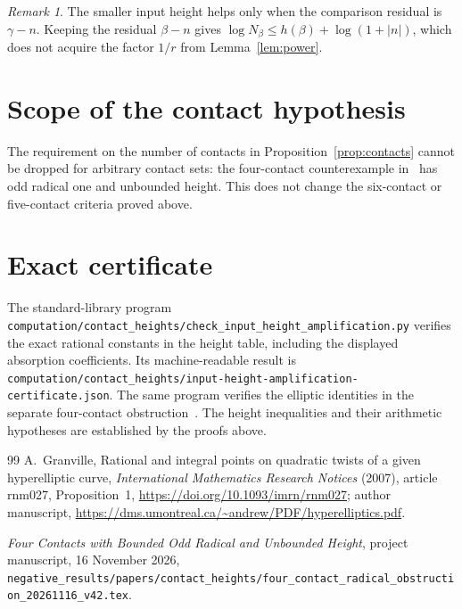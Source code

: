 \documentclass[11pt,a4paper]{article}
\theoremstyle{remark}\newtheorem{remark}[theorem]{Remark}
\begin{document}
\begin{remark}
The smaller input height helps only when the comparison residual
is $\gamma-n$. Keeping the residual $\beta-n$ gives
$\log N_\beta\le h(\beta)+\log(1+|n|)$, which does not acquire
the factor $1/r$ from Lemma~\ref{lem:power}.
\end{remark}

\section{Scope of the contact hypothesis}

The requirement on the number of contacts in
Proposition~\ref{prop:contacts} cannot be dropped for arbitrary contact
sets: the four-contact counterexample in~\cite{FourContacts} has odd
radical one and unbounded height. This does not change the six-contact
or five-contact criteria proved above.

\section{Exact certificate}

The standard-library program
\nolinkurl{computation/contact_heights/check_input_height_amplification.py}
verifies the exact rational constants in the height table, including
the displayed absorption coefficients. Its machine-readable result is
\nolinkurl{computation/contact_heights/input-height-amplification-certificate.json}.
The same program verifies the elliptic identities in the separate
four-contact obstruction~\cite{FourContacts}. The height inequalities
and their arithmetic hypotheses are established by the proofs above.

\begin{thebibliography}{99}
A.~Granville, Rational and integral points on quadratic twists of a
given hyperelliptic curve, \emph{International Mathematics Research
Notices} (2007), article rnm027, Proposition~1,
\url{https://doi.org/10.1093/imrn/rnm027}; author manuscript,
\url{https://dms.umontreal.ca/~andrew/PDF/hyperelliptics.pdf}.

\emph{Four Contacts with Bounded Odd Radical and Unbounded Height},
project manuscript, 16 November 2026,
\nolinkurl{negative_results/papers/contact_heights/four_contact_radical_obstruction_20261116_v42.tex}.
\end{thebibliography}
\end{document}
